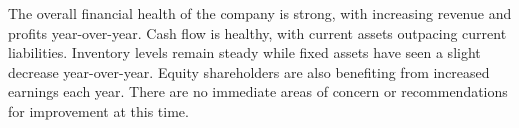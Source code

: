 

The overall financial health of the company is strong, with increasing revenue and profits year-over-year. Cash flow is healthy, with current assets outpacing current liabilities. Inventory levels remain steady while fixed assets have seen a slight decrease year-over-year. Equity shareholders are also benefiting from increased earnings each year. There are no immediate areas of concern or recommendations for improvement at this time.